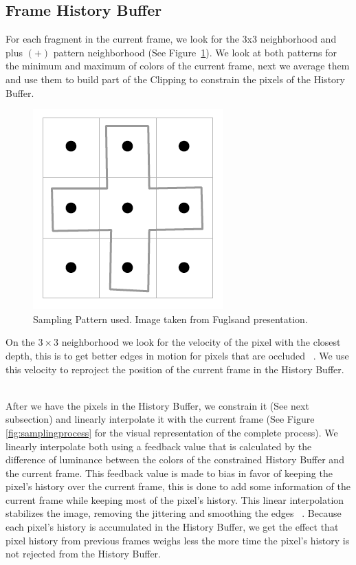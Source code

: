 \documentclass{cslthse-msc}
\begin{document}
\subsection{Frame History Buffer}
For each fragment in the current frame, we look for the 3x3 neighborhood and plus $(+)$ pattern neighborhood (See Figure~\ref{fig:samplingpattern}). We look at both patterns for the minimum and maximum of colors of the current frame, next we average them and use them to build part of the Clipping to constrain the pixels of the History Buffer. ~\cite{Fuglsand2016}
\begin{figure}[!hbt]
	\centering
	\includegraphics[scale=0.8]{images/sampling_pattern.png}
	\caption{Sampling Pattern used. Image taken from Fuglsand presentation. \protect\cite{Fuglsand2016}}\label{fig:samplingpattern}
\end{figure}

On the $3\times 3$ neighborhood we look for the velocity of the pixel with the closest depth, this is to get better edges in motion for pixels that are occluded ~\cite{Fuglsand2016}. We use this velocity to reproject the position of the current frame in the History Buffer. ~\cite{Fuglsand2016,XU2016}

After we have the pixels in the History Buffer, we constrain it (See next subsection) and linearly interpolate it with the current frame (See Figure \ref{fig:samplingprocess} for the visual representation of the complete process). We linearly interpolate both using a feedback value that is calculated by the difference of luminance between the colors of the constrained History Buffer and the current frame. This feedback value is made to bias in favor of keeping the pixel’s history over the current frame, this is done to add some information of the current frame while keeping most of the pixel's history. This linear interpolation stabilizes the image, removing the jittering and smoothing the edges ~\cite{Fuglsand2016,XU2016}. Because each pixel's history is accumulated in the History Buffer, we get the effect that pixel history from previous frames weighs less the more time the pixel's history is not rejected from the History Buffer. ~\cite{Fuglsand2016}
\end{document}
